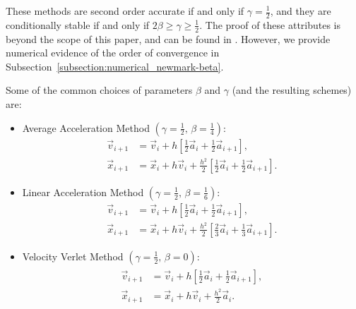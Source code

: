\documentclass[../Main.tex]{subfiles}
\begin{document}
These methods are second order accurate if and only if $\gamma = \frac{1}{2}$, and they are conditionally stable if and only if $2\beta \geq \gamma \geq \frac{1}{2}$. The proof of these attributes is beyond the scope of this paper, and can be found in \cite{Newmark1952}. However, we provide numerical evidence of the order of convergence in Subsection~\ref{subsection:numerical_newmark-beta}. 

Some of the common choices of parameters $\beta$ and $\gamma$ (and the resulting schemes) are:
\begin{itemize}
	\item Average Acceleration Method $\left(\gamma = \frac{1}{2} \mbox{, } \beta = \frac{1}{4}\right)$:
\begin{align*}
	\vec{v}_{i+1} & = \vec{v}_{i} + h\left[\frac{1}{2}\vec{a}_{i} + \frac{1}{2}\vec{a}_{i+1}\right],\\
	\vec{x}_{i+1} & = \vec{x}_{i} + h\vec{v}_{i} + \frac{h^2}{2}\left[\frac{1}{2}\vec{a}_{i} +\frac{1}{2}\vec{a}_{i+1}\right].
\end{align*}
	\item Linear Acceleration Method $\left(\gamma = \frac{1}{2} \mbox{, } \beta = \frac{1}{6}\right)$:
\begin{align*}
	\vec{v}_{i+1} & = \vec{v}_{i} + h\left[\frac{1}{2}\vec{a}_{i} + \frac{1}{2}\vec{a}_{i+1}\right],\\
	\vec{x}_{i+1} & = \vec{x}_{i} + h\vec{v}_{i} + \frac{h^2}{2}\left[\frac{2}{3}\vec{a}_{i} +\frac{1}{3}\vec{a}_{i+1}\right].
\end{align*}
	\item Velocity Verlet Method $\left(\gamma = \frac{1}{2} \mbox{, } \beta = 0\right)$:
\begin{align}
	\begin{split}
	\vec{v}_{i+1} & = \vec{v}_{i} + h\left[\frac{1}{2}\vec{a}_{i} + \frac{1}{2}\vec{a}_{i+1}\right], \\
	\vec{x}_{i+1} & = \vec{x}_{i} + h\vec{v}_{i} + \frac{h^2}{2}\vec{a}_{i}.
		\end{split} \label{eqn:velocity_verlet}
\end{align}
\end{itemize}
\end{document}
